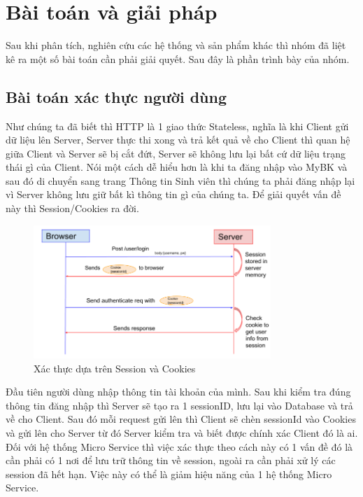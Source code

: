 \chapter{Bài toán và giải pháp}\label{chap:ProblemAndSolve}
		Sau khi phân tích, nghiên cứu các hệ thống và sản phẩm khác thì nhóm đã liệt kê ra một số bài toán cần phải giải quyết. Sau đây là phần trình bày của nhóm.
		
		\section{Bài toán xác thực người dùng}
		Như chúng ta đã biết thì HTTP là 1 giao thức Stateless, nghĩa là khi Client gửi dữ liệu lên Server, Server thực thi xong và trả kết quả về cho Client thì quan hệ giữa Client và Server sẽ bị cắt đứt, Server sẽ không lưu lại bất cứ dữ liệu trạng thái gì của Client. Nói một cách dễ hiểu hơn là khi ta đăng nhập vào MyBK và sau đó di chuyển sang trang Thông tin Sinh viên thì chúng ta phải đăng nhập lại vì Server không lưu giữ bất kì thông tin gì của chúng ta. Để giải quyết vấn đề này thì Session/Cookies ra đời.
	
		\begin{figure}[H]
			\includegraphics[width=0.8\textwidth]{Images/session-cookies.png}
			\centering
			\linebreak
			\caption{Xác thực dựa trên Session và Cookies\cite{sessioncookies}}
		\end{figure}
		
		Đầu tiên người dùng nhập thông tin tài khoản của mình. Sau khi kiểm tra đúng thông tin đăng nhập thì Server sẽ tạo ra 1 sessionID, lưu lại vào Database và trả về cho Client. Sau đó mỗi request gửi lên thì Client sẽ chèn sessionId vào Cookies và gửi lên cho Server từ đó Server kiểm tra và biết được chính xác Client đó là ai.\\
		
		Đối với hệ thống Micro Service thì việc xác thực theo cách này có 1 vấn đề đó là cần phải có 1 nơi để lưu trữ thông tin về session, ngoài ra cần phải xử lý các session đã hết hạn. Việc này có thể là giảm hiệu năng của 1 hệ thống Micro Service.\\
		

